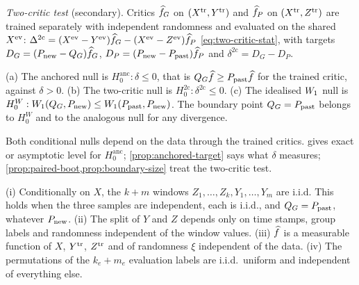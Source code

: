 \emph{Two-critic test} (secondary). Critics $\widehat{f}_G$ on $(X^{\mathrm{tr}},Y^{\mathrm{tr}})$ and $\widehat{f}_P$ on
$(X^{\mathrm{tr}},Z^{\mathrm{tr}})$ are trained separately with independent randomness and evaluated on the
shared $X^{\mathrm{ev}}$: $\Delta^{\mathrm{2c}}=(X^{\mathrm{ev}}-Y^{\mathrm{ev}})\widehat{f}_G-(X^{\mathrm{ev}}-Z^{\mathrm{ev}})\widehat{f}_P$
\eqref{eq:two-critic-stat}, with targets $D_G=(P_{\mathrm{new}}-Q_{G})\widehat{f}_G$, $D_P=(P_{\mathrm{new}}-P_{\mathrm{past}})\widehat{f}_P$ and
$\delta^{\mathrm{2c}}=D_G-D_P$.

\begin{definition}\label{def:rel-null}
(a) The anchored null is $H_0^{\mathrm{anc}}:\delta\le0$, that is $Q_{G}\widehat{f}\ge P_{\mathrm{past}}\widehat{f}$ for the
trained critic, against $\delta>0$. (b) The two-critic null is
$H_0^{\mathrm{2c}}:\delta^{\mathrm{2c}}\le0$. (c) The idealised $W_{1}$ null is
$H_0^{W}:W_{1}(Q_{G},P_{\mathrm{new}})\le W_{1}(P_{\mathrm{past}},P_{\mathrm{new}})$. The boundary point $Q_{G}=P_{\mathrm{past}}$ belongs to $H_0^W$ and
to the analogous null for any divergence.
\end{definition}

Both conditional nulls depend on the data through the trained critics. 
gives exact or asymptotic level for $H_0^{\mathrm{anc}}$; \cref{prop:anchored-target} says what
$\delta$ measures; \cref{prop:paired-boot,prop:boundary-size} treat the two-critic test.

\begin{assumption}\label{ass:anc}
(i) Conditionally on $X$, the $k+m$ windows $Z_1,\dots,Z_k,Y_1,\dots,Y_m$ are i.i.d. This holds
when the three samples are independent, each is i.i.d., and $Q_{G}=P_{\mathrm{past}}$, whatever $P_{\mathrm{new}}$.
(ii) The split of $Y$ and $Z$ depends only on time stamps, group labels and randomness independent
of the window values. (iii) $\widehat{f}$ is a measurable function of $X$, $Y^{\mathrm{tr}}$, $Z^{\mathrm{tr}}$ and of
randomness $\xi$ independent of the data. (iv) The permutations of the $k_e+m_e$ evaluation labels
are i.i.d.\ uniform and independent of everything else.
\end{assumption}

